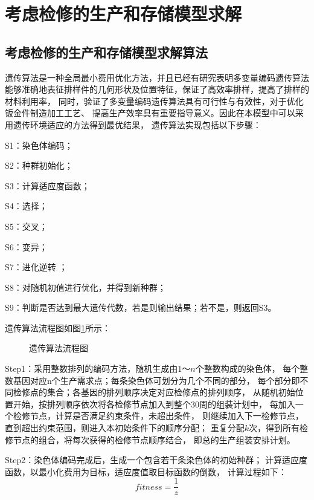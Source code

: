 \section{考虑检修的生产和存储模型求解}

\subsection{考虑检修的生产和存储模型求解算法}
遗传算法是一种全局最小费用优化方法，并且已经有研究表明多变量编码遗传算法
能够准确地表征排样件的几何形状及位置特征，保证了高效率排样，提高了排样的材料利用率，
同时，验证了多变量编码遗传算法具有可行性与有效性，对于优化钣金件制造加工工艺、
提高生产效率具有重要指导意义。因此在本模型中可以采用遗传环境适应的方法得到最优结果，
遗传算法实现包括以下步骤：

S1：染色体编码；

S2：种群初始化；

S3：计算适应度函数；

S4：选择；

S5：交叉；

S6：变异；

S7：进化逆转 ；

S8：对随机初值进行优化，并得到新种群；

S9：判断是否达到最大遗传代数，若是则输出结果；若不是，则返回S3。

遗传算法流程图如图\ref{f.ch4-1}所示：

\begin{figure}[h]
    \centering
    
    \caption{遗传算法流程图}
    \label{f.ch4-1}
\end{figure}

Step1：采用整数排列的编码方法，随机生成由$1～n$个整数构成的染色体，
每个整数基因对应n个生产需求点；每条染色体可划分为几个不同的部分，
每个部分即不同检修点的集合；各基因的排列顺序决定对应检修点的排列顺序，
从随机初始位置开始，按排列顺序依次将各检修节点加入到整个30周的组装计划中，
每加入一个检修节点，计算是否满足约束条件，未超出条件，
则继续加入下一检修节点，直到超出约束范围，则进入本初始条件下的顺序分配；
重复分配$k$次，得到所有检修节点的组合，将每次获得的检修节点顺序结合，
即总的生产组装安排计划。

Step2：染色体编码完成后，生成一个包含若干条染色体的初始种群；
计算适应度函数，以最小化费用为目标，适应度值取目标函数的倒数，
计算过程如下：
\begin{equation}
    \label{eq_fitness}
    fitness=\frac{1}{z}
\end{equation}

